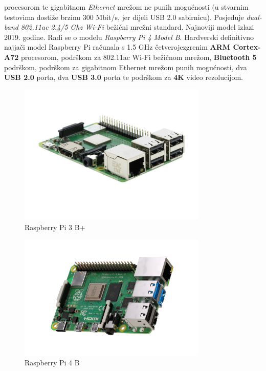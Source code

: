 \documentclass[11pt]{article}
\begin{document}
 procesorom te gigabitnom \textit{Ethernet} mrežom ne punih mogućnosti (u
 stvarnim testovima dostiže brzinu 300 Mbit/s, jer dijeli USB 2.0 sabirnicu).
 Posjeduje \textit{dual-band 802.11ac 2.4/5 Ghz Wi-Fi} bežični mrežni standard.
\newline
 Najnoviji model izlazi 2019. godine. Radi se o modelu \textit{Raspberry Pi
 4 Model B}. Hardverski definitivno najjači model Raspberry Pi računala s
 1.5 GHz četverojezgrenim \textbf{ARM Cortex-A72} procesorom, podrškom za
 802.11ac Wi-Fi bežičnom mrežom, \textbf{Bluetooth 5} podrškom,
 podrškom za gigabitnom Ethernet mrežom punih mogućnosti, dva \textbf{USB 2.0}
 porta, dva \textbf{USB 3.0} porta te podrškom za \textbf{4K} video rezolucijom.
\begin{figure}[h!]
\centering
\includegraphics[width=0.8\textwidth]{rpi-3-b-plus.jpg}
\captionsetup{justification=centering}
\caption{Raspberry Pi 3 B+}
\end{figure}
\begin{figure}[h!]
\centering
\includegraphics[width=0.8\textwidth]{rpi-4.png}
\captionsetup{justification=centering}
\caption{Raspberry Pi 4 B}
\end{figure}
\end{document}
